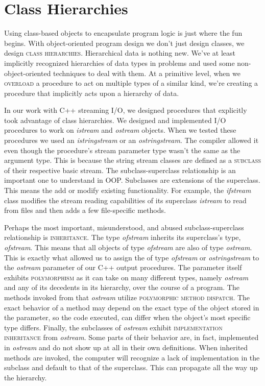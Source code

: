 \documentclass[nobib]{tufte-handout}
\begin{document}
\section{Class Hierarchies}

Using class-based objects to encapsulate program logic is just where the fun begins. With object-oriented program design we don't just design classes, we design \textsc{class hierarchies}. Hierarchical data is nothing new. We've at least implicitly recognized hierarchies of data types in problems and used some non-object-oriented techniques to deal with them. At a primitive level, when we \textsc{overload} a procedure to act on multiple types of a similar kind, we're creating a procedure that implicitly acts upon a hierarchy of data.

In our work with C++ streaming I/O, we designed procedures that explicitly took advantage of class hierarchies.  We designed and implemented I/O procedures to work on \textit{istream} and \textit{ostream} objects. When we tested these procedures we used an \textit{istringstream} or an \textit{ostringstream}. The compiler allowed it even though the procedure's stream parameter type wasn't the same as the argument type. This is because the string stream classes are defined as a \textsc{subclass} of their respective basic stream. The subclass-superclass relationship is an important one to understand in OOP\@. Subclasses are extensions of the superclass. This means the add or modify existing functionality. For example, the \textit{ifstream} class modifies the stream reading capabilities of its superclass \textit{istream} to read from files and then adds a few file-specific methods.

Perhaps the most important, misunderstood, and abused subclass-superclass relationship is \textsc{inheritance}. The type \textit{ofstream} inherits its superclass's type, \textit{ofstream}. This means that all objects of type \textit{ofstream} are also of type \textit{ostream}. This is exactly what allowed us to assign the of type \textit{ofstream} or \textit{ostringstream} to the \textit{ostream} parameter of our C++ output procedures.  The parameter itself exhibits \textsc{polymorphism} as it can take on many different types, namely \textit{ostream} and any of its decedents in its hierarchy, over the course of a program. The methods invoked from that \textit{ostream} utilize \textsc{polymorphic method dispatch}.  The exact behavior of a method may depend on the exact type of the object stored in the parameter, so the code executed, can differ when the object's most specific type differs. Finally, the subclasses of \textit{ostream} exhibit \textsc{implementation inheritance} from \textit{ostream}.  Some parts of their behavior are, in fact, implemented in \textit{ostream} and do not show up at all in their own definitions. When inherited methods are invoked, the computer will recognize a lack of implementation in the subclass and default to that of the superclass. This can propagate all the way up the hierarchy.
\end{document}
